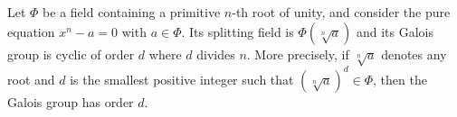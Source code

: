 Let $\Phi$ be a field containing a primitive $n$-th root of unity, and consider the pure equation $x^n - a = 0$ with $a \in \Phi$. Its splitting field is $\Phi(\sqrt[n]{a})$ and its Galois group is cyclic of order $d$ where $d$ divides $n$. More precisely, if $\sqrt[n]{a}$ denotes any root and $d$ is the smallest positive integer such that $(\sqrt[n]{a})^d \in \Phi$, then the Galois group has order $d$.
